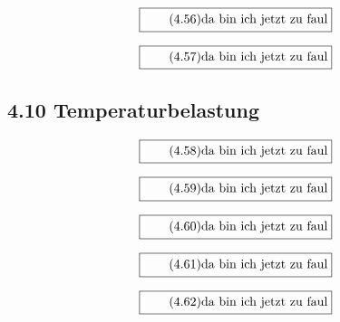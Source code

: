 \documentclass[11pt]{article}
\newcommand{\1}{ {\mathds{1}} }
\begin{document}
    \begin{equation}
      \boxed{
        \tag{4.56}
        \begin{split}
          \text{da bin ich jetzt zu faul}
        \end{split}
      }
    \end{equation}

    \begin{equation}
      \boxed{
        \tag{4.57}
        \begin{split}
          \text{da bin ich jetzt zu faul}
        \end{split}
      }
    \end{equation}
    \subsection*{4.10 Temperaturbelastung}

    \begin{equation}
      \boxed{
        \tag{4.58}
        \begin{split}
          \text{da bin ich jetzt zu faul}
        \end{split}
      }
    \end{equation}
    
    \begin{equation}
      \boxed{
        \tag{4.59}
        \begin{split}
          \text{da bin ich jetzt zu faul}
        \end{split}
      }
    \end{equation}

    \begin{equation}
      \boxed{
        \tag{4.60}
        \begin{split}
          \text{da bin ich jetzt zu faul}
        \end{split}
      }
    \end{equation}

    \begin{equation}
      \boxed{
        \tag{4.61}
        \begin{split}
          \text{da bin ich jetzt zu faul}
        \end{split}
      }
    \end{equation}

    \begin{equation}
      \boxed{
        \tag{4.62}
        \begin{split}
          \text{da bin ich jetzt zu faul}
        \end{split}
      }
    \end{equation}
    
\end{document}
